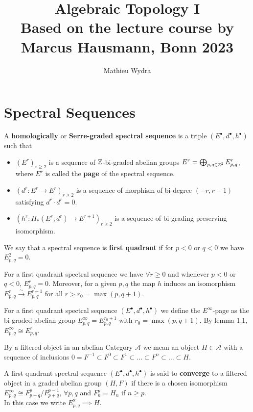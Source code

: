 \documentclass[10pt,a4paper]{article}
\title{Algebraic Topology I\\[0.2em]\smaller{}Based on the lecture course by Marcus Hausmann, Bonn 2023}
\author{Mathieu Wydra}
\date{}
\begin{document}
\maketitle
\section{Spectral Sequences}
\begin{defn}
A \textbf{homologically} or \textbf{Serre-graded spectral sequence} is a triple $(E^\bullet,d^\bullet,h^\bullet)$ such that
\begin{itemize}
\item $(E^r)_{r\geq 2}$ is a sequence of $\mathbb{Z}$-bi-graded abelian groups 
$E^r = \bigoplus_{p,q\in \mathbb{Z}^2} E_{p,q}^r$, where $E^r$ is called the \textbf{page} of the spectral sequence.
\item $(d^r:E^r\to E^r)_{r\geq 2}$ is a sequence of morphism of bi-degree $(-r,r-1)$ satisfying $d^r\cdot d^r = 0$.
\item $(h^r:H_*(E^r,d^r)\to E^{r+1})_{r\geq 2}$ is a sequence of bi-grading preserving isomorphism.
\end{itemize}
\end{defn}

\begin{defn}
We say that a spectral sequence is \textbf{first quadrant} if for $p<0$ or $q<0$ we have $E^2_{p,q}=0$.
\end{defn}

\begin{lemma}
For a first quadrant spectral sequence we have $\forall r\geq 0$ and whenever $p<0$ or $q<0$, $E^r_{p,q} = 0$. Moreover, for a given $p,q$ the map $h$ induces an isomorphism $E^r_{p,q} \xrightarrow{\sim} E^{r+1}_{p,q}$ for all $r>r_0=\max(p,q+1)$.
\end{lemma}

\begin{defn}
For a first quadrant spectral sequence $(E^\bullet,d^\bullet,h^\bullet)$ we define the $E^\infty$-page as the bi-graded abelian group $E^\infty_{p,q} = E^{r_0+1}_{p,q}$ with $r_0 =\max(p,q+1)$. By lemma 1.1, $E^\infty_{p,q} \cong E^{r}_{p,q}$.
\end{defn}

By a filtered object in an abelian Category $\mathcal{A}$ we mean an object $H\in \mathcal{A}$ with a sequence of inclusions $0 =F^{-1}\subset F^0 \subset F^1 \subset \ldots\subset F^n\subset \ldots \subset H$.

\begin{defn}
A first quadrant spectral sequence $(E^\bullet,d^\bullet,h^\bullet)$ is said to \textbf{converge} to a filtered object in a graded abelian group $(H,F)$ if there is a chosen isomorphism $E^\infty_{p,q} \cong F^p_{p+q}/F^{p-1}_{p+q}$, $\forall p,q$ and $F^p_n = H_n$ if $n\geq p$.\\
In this case we write $E^2_{p,q} \implies H$.
\end{defn}
\end{document}
